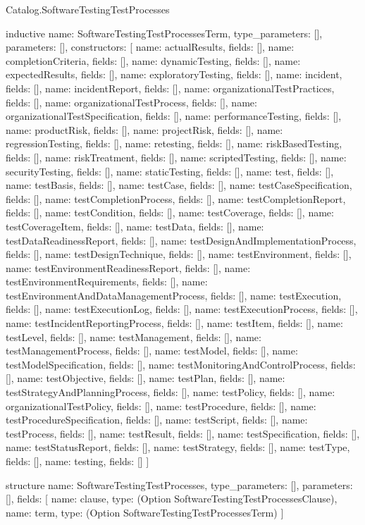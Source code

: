 \begin{lexlean}{Catalog.SoftwareTestingTestProcesses}
\begin{semanticmodule}
inductive{
  name: SoftwareTestingTestProcessesTerm,
  type_parameters: [],
  parameters: [],
  constructors: [
    {name: actualResults, fields: []},
    {name: completionCriteria, fields: []},
    {name: dynamicTesting, fields: []},
    {name: expectedResults, fields: []},
    {name: exploratoryTesting, fields: []},
    {name: incident, fields: []},
    {name: incidentReport, fields: []},
    {name: organizationalTestPractices, fields: []},
    {name: organizationalTestProcess, fields: []},
    {name: organizationalTestSpecification, fields: []},
    {name: performanceTesting, fields: []},
    {name: productRisk, fields: []},
    {name: projectRisk, fields: []},
    {name: regressionTesting, fields: []},
    {name: retesting, fields: []},
    {name: riskBasedTesting, fields: []},
    {name: riskTreatment, fields: []},
    {name: scriptedTesting, fields: []},
    {name: securityTesting, fields: []},
    {name: staticTesting, fields: []},
    {name: test, fields: []},
    {name: testBasis, fields: []},
    {name: testCase, fields: []},
    {name: testCaseSpecification, fields: []},
    {name: testCompletionProcess, fields: []},
    {name: testCompletionReport, fields: []},
    {name: testCondition, fields: []},
    {name: testCoverage, fields: []},
    {name: testCoverageItem, fields: []},
    {name: testData, fields: []},
    {name: testDataReadinessReport, fields: []},
    {name: testDesignAndImplementationProcess, fields: []},
    {name: testDesignTechnique, fields: []},
    {name: testEnvironment, fields: []},
    {name: testEnvironmentReadinessReport, fields: []},
    {name: testEnvironmentRequirements, fields: []},
    {name: testEnvironmentAndDataManagementProcess, fields: []},
    {name: testExecution, fields: []},
    {name: testExecutionLog, fields: []},
    {name: testExecutionProcess, fields: []},
    {name: testIncidentReportingProcess, fields: []},
    {name: testItem, fields: []},
    {name: testLevel, fields: []},
    {name: testManagement, fields: []},
    {name: testManagementProcess, fields: []},
    {name: testModel, fields: []},
    {name: testModelSpecification, fields: []},
    {name: testMonitoringAndControlProcess, fields: []},
    {name: testObjective, fields: []},
    {name: testPlan, fields: []},
    {name: testStrategyAndPlanningProcess, fields: []},
    {name: testPolicy, fields: []},
    {name: organizationalTestPolicy, fields: []},
    {name: testProcedure, fields: []},
    {name: testProcedureSpecification, fields: []},
    {name: testScript, fields: []},
    {name: testProcess, fields: []},
    {name: testResult, fields: []},
    {name: testSpecification, fields: []},
    {name: testStatusReport, fields: []},
    {name: testStrategy, fields: []},
    {name: testType, fields: []},
    {name: testing, fields: []}
  ]
}

structure{
  name: SoftwareTestingTestProcesses,
  type_parameters: [],
  parameters: [],
  fields: [
    {name: clause, type: (Option SoftwareTestingTestProcessesClause)},
    {name: term, type: (Option SoftwareTestingTestProcessesTerm)}
  ]
}
\end{semanticmodule}
\end{lexlean}

